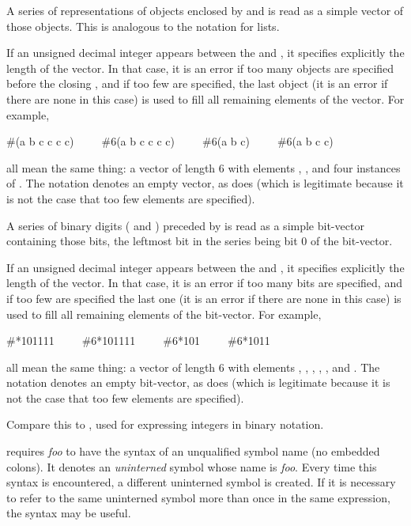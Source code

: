 \begin{flushdesc}
\item[\cd{\#(}]
A series of representations of objects enclosed by \cd{\#(} and \cd{)}
is read as a simple vector of those objects.  This is analogous to
the notation for lists.

If an unsigned decimal integer appears between the \cd{\#} and \cd{(},
it specifies explicitly the length of the vector.  In that case,
it is an error if too many objects are specified before the closing \cd{)},
and if too few are specified, the last object
(it is an error if there are none in this case)
is used to fill all
remaining elements of the vector.
For example,
\begin{lisp}
\#(a b c c c c)~~~~~\#6(a b c c c c)~~~~~\#6(a b c)~~~~~\#6(a b c c)
\end{lisp}
all mean the same thing: a vector of length 6 with elements , ,
and four instances of .  
The notation \cd{\#()} denotes an empty vector, as does 
(which is legitimate because it is not the case that too few elements
are specified).

\item[\cd{\#*}]
A series of binary digits ( and ) preceded by \cd{\#*} is
read as a simple bit-vector containing those bits, the leftmost bit
in the series being bit 0 of the bit-vector.

If an unsigned decimal integer appears between the \cd{\#} and \cd{*},
it specifies explicitly the length of the vector.  In that case,
it is an error if too many bits are specified,
and if too few are specified the last one
(it is an error if there are none in this case)
is used to fill all remaining elements of the bit-vector.
For example,
\begin{lisp}
\#*101111~~~~~\#6*101111~~~~~\#6*101~~~~~\#6*1011
\end{lisp}
all mean the same thing: a vector of length 6 with elements , ,
, , , and .
The notation \cd{\#*} denotes an empty bit-vector, as does 
(which is legitimate because it is not the case that too few elements
are specified).
\begin{new}
Compare this to , used for expressing integers in binary notation.
\end{new}

\item[\cd{\#:}]
 requires {\it foo} to have the syntax of an unqualified
symbol name (no embedded colons).  It denotes an {\it uninterned} symbol
whose name is {\it foo}.  Every time this syntax is encountered, a different
uninterned symbol is created.  If it is necessary to refer to the
same uninterned symbol more than once in the same expression,
the \cd{\#=} syntax may be useful.


\end{flushdesc}
